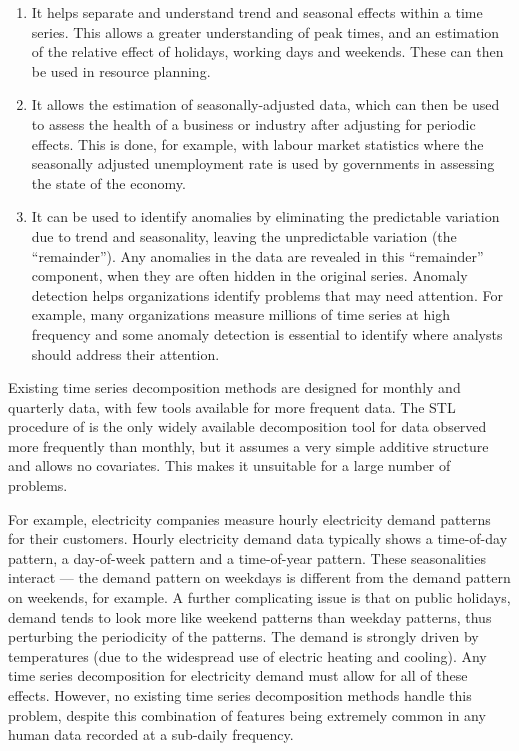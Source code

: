 \documentclass[11pt,a4paper,]{article}
\providecommand{\tightlist}{%
  \setlength{\itemsep}{0pt}\setlength{\parskip}{0pt}}
\begin{document}
\begin{enumerate}
\def\labelenumi{\arabic{enumi}.}
\tightlist
\item
  It helps separate and understand trend and seasonal effects within a time series. This allows a greater understanding of peak times, and an estimation of the relative effect of holidays, working days and weekends. These can then be used in resource planning.
\item
  It allows the estimation of seasonally-adjusted data, which can then be used to assess the health of a business or industry after adjusting for periodic effects. This is done, for example, with labour market statistics where the seasonally adjusted unemployment rate is used by governments in assessing the state of the economy.
\item
  It can be used to identify anomalies by eliminating the predictable variation due to trend and seasonality, leaving the unpredictable variation (the ``remainder''). Any anomalies in the data are revealed in this ``remainder'' component, when they are often hidden in the original series. Anomaly detection helps organizations identify problems that may need attention. For example, many organizations measure millions of time series at high frequency and some anomaly detection is essential to identify where analysts should address their attention.
\end{enumerate}

Existing time series decomposition methods are designed for monthly and quarterly data, with few tools available for more frequent data. The STL procedure of \textcite{cleveland1990stl} is the only widely available decomposition tool for data observed more frequently than monthly, but it assumes a very simple additive structure and allows no covariates. This makes it unsuitable for a large number of problems.

For example, electricity companies measure hourly electricity demand patterns for their customers. Hourly electricity demand data typically shows a time-of-day pattern, a day-of-week pattern and a time-of-year pattern. These seasonalities interact --- the demand pattern on weekdays is different from the demand pattern on weekends, for example. A further complicating issue is that on public holidays, demand tends to look more like weekend patterns than weekday patterns, thus perturbing the periodicity of the patterns. The demand is strongly driven by temperatures (due to the widespread use of electric heating and cooling). Any time series decomposition for electricity demand must allow for all of these effects. However, no existing time series decomposition methods handle this problem, despite this combination of features being extremely common in any human data recorded at a sub-daily frequency.
\end{document}
